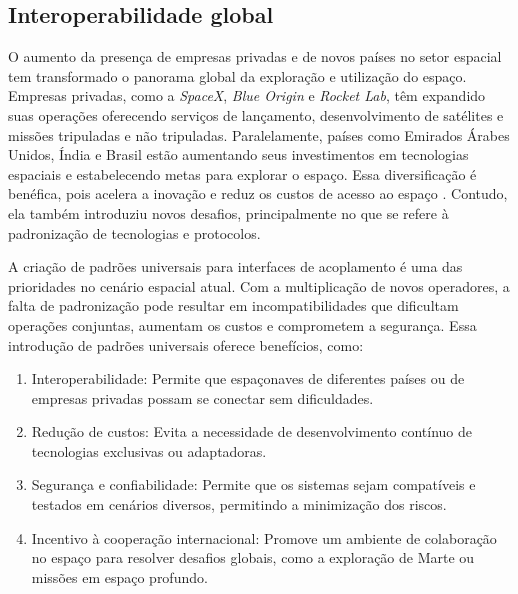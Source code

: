 \subsection{Interoperabilidade global}

O aumento da presença de empresas privadas e de novos países no setor espacial tem transformado o panorama global da exploração e utilização do espaço.
Empresas privadas, como a \emph{SpaceX}, \emph{Blue Origin} e \emph{Rocket Lab}, têm expandido suas operações oferecendo serviços de lançamento, desenvolvimento de satélites e missões tripuladas e não tripuladas.
Paralelamente, países como Emirados Árabes Unidos, Índia e Brasil \cite{senadoALADA} estão aumentando seus investimentos em tecnologias espaciais e estabelecendo metas para explorar o espaço.
Essa diversificação é benéfica, pois acelera a inovação e reduz os custos de acesso ao espaço \cite{jones2018}.
Contudo, ela também introduziu novos desafios, principalmente no que se refere à padronização de tecnologias e protocolos.

A criação de padrões universais para interfaces \cite{nasaManualOfDocking2017} de acoplamento é uma das prioridades no cenário espacial atual.
Com a multiplicação de novos operadores, a falta de padronização pode resultar em incompatibilidades que dificultam operações conjuntas, aumentam os custos e comprometem a segurança.
Essa introdução de padrões universais oferece benefícios, como:

\begin{enumerate}[label=(\roman*)]
    \item Interoperabilidade: Permite que espaçonaves de diferentes países ou de empresas privadas possam se conectar sem dificuldades.
    \item Redução de custos: Evita a necessidade de desenvolvimento contínuo de tecnologias exclusivas ou adaptadoras.
    \item Segurança e confiabilidade: Permite que os sistemas sejam compatíveis e testados em cenários diversos, permitindo a minimização dos riscos.
    \item Incentivo à cooperação internacional: Promove um ambiente de colaboração no espaço para resolver desafios globais, como a exploração de Marte ou missões em espaço profundo.
\end{enumerate}